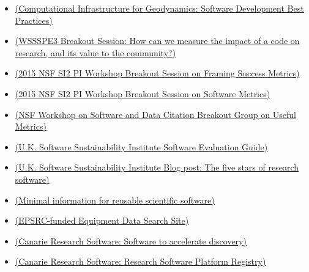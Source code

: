 \begin{itemize}

\item
\href{https://geodynamics.org/cig/dev/best-practices/}{(Computational Infrastructure for Geodynamics: Software Development Best Practices)}

\item
\href{https://docs.google.com/document/d/1cgUDH3RxrfsLotWhKKOrXUnaYFhrtjcV1TDRkFtwQKI/edit}{(WSSSPE3 Breakout Session: How can we measure the impact of a code on research, and its value to the community?)}

\item
\href{https://docs.google.com/document/d/10yj7MYEjvrg__t522XR41ogASYMp647-l-BpFTsqEV4/edit#heading=h.5lah0hp73q99}{(2015 NSF SI2 PI Workshop Breakout Session on Framing Success Metrics)}

\item
\href{https://docs.google.com/document/d/1uDim5bw8rBuubmtaUrz5Eh35NxzDgivmmdXhVzDs3tc/edit}{(2015 NSF SI2 PI Workshop Breakout Session on Software Metrics)}

\item
\href{https://docs.google.com/presentation/d/1PPLVL6uoOmisqnHTlwhsVKJBTFFK1IVzvr8FdEEIvAE/edit#slide=id.g5e66ec9f2_027}{(NSF Workshop on Software and Data Citation Breakout Group on Useful Metrics)}

\item
\href{http://www.software.ac.uk/software-evaluation-guide}{(U.K. Software Sustainability Institute Software Evaluation Guide)}

\item
\href{http://www.software.ac.uk/blog/2013-04-09-five-stars-research-software}{(U.K. Software Sustainability Institute Blog post: The five stars of research software)}

\item
\href{http://figshare.com/articles/Minimal_information_for_reusable_scientific_software/1112528}{(Minimal information for reusable scientific software)}

\item
\href{http://equipment.data.ac.uk/}{(EPSRC-funded Equipment Data Search Site)}

\item
\href{http://www.canarie.ca/software/}{(Canarie Research Software: Software to accelerate discovery)}

\item
\href{https://science.canarie.ca/researchmiddleware/platforms/list/main.html}{(Canarie Research Software: Research Software Platform Registry)}


\end{itemize}
